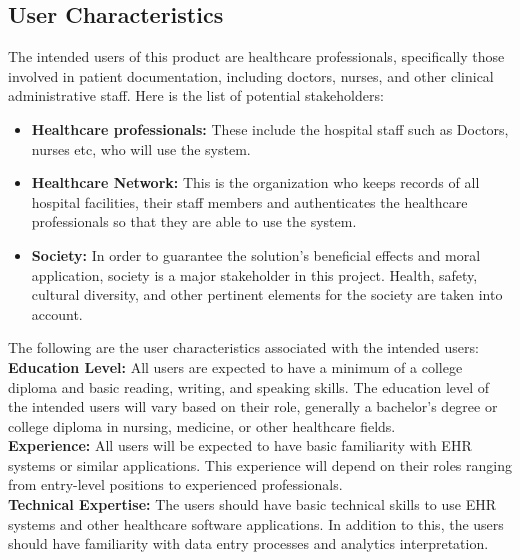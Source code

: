 \documentclass[12pt]{article}
\begin{document}
\subsection{User Characteristics} \label{sec_UserCharacteristics}

The intended users of this product are healthcare professionals, specifically those involved in patient documentation, including doctors, nurses, and other clinical administrative staff. Here is the list of potential stakeholders:\\

\begin{itemize}
  \item\textbf{Healthcare professionals:} These include the hospital staff such as Doctors, nurses etc, who will use the system.
  \item\textbf{Healthcare Network:} This is the organization who keeps records of all hospital facilities, their staff members and authenticates the healthcare professionals so that they are able to use the system.
  \item\textbf{Society:} In order to guarantee the solution's beneficial effects and moral application, society is a major stakeholder in this project. Health, safety, cultural diversity, and other pertinent elements for the society are taken into account.
\end{itemize}

The following are the user characteristics associated with the intended users:\\

\textbf{Education Level:} All users are expected to have a minimum of a college diploma and basic reading, writing, and speaking skills. The education level of the intended users will vary based on their role, generally a bachelor’s degree or college diploma in nursing, medicine, or other healthcare fields. \\

\textbf{Experience:} All users will be expected to have basic familiarity with EHR systems or similar applications. This experience will depend on their roles ranging from entry-level positions to experienced professionals. \\

\textbf{Technical Expertise:} The users should have basic technical skills to use EHR systems and other healthcare software applications. In addition to this, the users should have familiarity with data entry processes and analytics interpretation. \\
\end{document}
